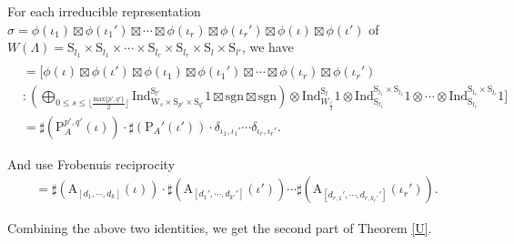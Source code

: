 \documentclass[12pt, a4paper]{amsart}
\numberwithin{equation}{section}
\newcommand{\CK}{{\mathcal {K}}}
\newcommand{\Ind}{{\mathrm{Ind}}}
\newcommand{\sgn}{{\mathrm{sgn}}}
\begin{document}
For each irreducible representation $\sigma =  \phi(\iota_1) \boxtimes \phi(\iota_1') \boxtimes \cdots \boxtimes \phi(\iota_r) \boxtimes \phi(\iota_r')\boxtimes \phi(\iota) \boxtimes \phi(\iota')$ of $W(\Lambda) = \mathrm{S}_{l_1} \times \mathrm{S}_{l_1} \times \cdots \times \mathrm{S}_{l_r} \times \mathrm{S}_{l_r} \times \mathrm{S}_{l} \times \mathrm{S}_{l'}$, we have
\begin{align*}
    [\sigma: &\mathrm{Coh}_{\Lambda}(\CK(G))]\\
    &= [\phi(\iota) \boxtimes \phi(\iota') \boxtimes \phi(\iota_1) \boxtimes \phi(\iota_1') \boxtimes \cdots \boxtimes \phi(\iota_r) \boxtimes \phi(\iota_r')\\
    &:(\bigoplus_{0 \leq s \leq \lfloor\frac{\mathrm{max}\{p',q'\}}{2}\rfloor}\Ind _{\mathrm{W}_{s} \times \mathrm{S}_{p'} \times \mathrm{S}_{q'}}^{\mathrm{S}_{l'}}1 \boxtimes \sgn \boxtimes \sgn ) \otimes \Ind_{W_{\frac{l}{2}}}^{\mathrm{S}_{l}} 1 \otimes \Ind_{\mathrm{S}_{l_1}}^{\mathrm{S}_{l_1}\times \mathrm{S}_{l_1}}1 \otimes \cdots \otimes \Ind_{\mathrm{S}_{l_r}}^{\mathrm{S}_{l_r}\times \mathrm{S}_{l_r}}1]\\
    & = \sharp(\mathrm{P}^{p',q'}_A(\iota))\cdot \sharp(\mathrm{P}_{A}'(\iota'))\cdot \delta_{\iota_1,\iota_1'} \cdots \delta_{\iota_r,\iota_r'}. 
\end{align*}

And use Frobenuis reciprocity
\begin{align*}
    [1_{W_{\nu}}: \sigma] = \sharp(\mathrm{A}_{[d_1,\cdots,d_k]}(\iota))\cdot \sharp(\mathrm{A}_{[d_1',\cdots,d_{k'}']}(\iota'))\cdots \sharp(\mathrm{A}_{[d_{r,1}',\cdots,d_{r,k_r'}']}(\iota_r')).
\end{align*}

Combining the above two identities, we get the second part of Theorem \ref{U}.
\end{document}
